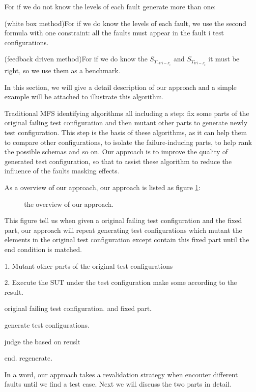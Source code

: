\documentclass{sig-alternate}
\begin{document}
For if we do not know the levels of each fault generate more than one:

(white box method)For if we do know the levels of each fault, we use the second formula with one constraint: all the faults must appear in the fault i test configurations.

(feedback driven method)For if we do know the $S_{T_{\neg tri-F_{i}}}$ and $S_{T_{tri-F_{i}}}$ it must be right, so we use them as a benchmark.




In this section, we will give a detail description of our approach and a simple example will be attached to illustrate this algorithm.

Traditional MFS identifying algorithms all including a step: fix some parts of the original failing test configuration and then mutant other parts  to generate newly test configuration. This step is the basis of these algorithms, as it can help them to compare other configurations, to isolate the failure-inducing parts, to help rank the possible schemas and so on. Our approach is to improve the quality of generated test configuration, so that to assist these algorithm to reduce the influence of the faults masking effects.

As a overview of our approach, our approach is listed as figure \ref{framework}:

\begin{figure}
\centering
\label{framework}
\caption{the overview of our approach.}
\end{figure}

This figure tell us when given a original failing test configuration and the fixed part, our approach will repeat generating test configurations which mutant the elements in the original test configuration except contain this fixed part until the end condition is matched.



1. Mutant other parts of the original test configurations

2. Execute the SUT under the test configuration make some  according to the result.

original failing test configuration.  and fixed part.

generate test configurations.

judge the based on reuslt

end. regenerate.

In a word, our approach takes a revalidation strategy when encouter different faults until we find a test case. Next we will discuss the two parts in detail.
\end{document}

